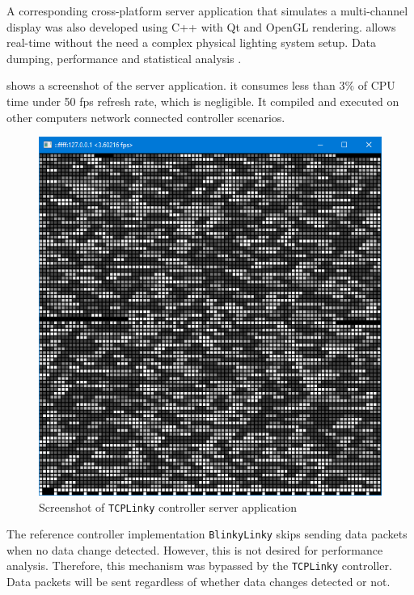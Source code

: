A corresponding cross-platform server application that simulates a multi-channel display was also developed using C++ with Qt \cite{qt} and OpenGL \cite{shreiner2009opengl} rendering.  allows real-time  without the need  a complex physical lighting system setup. Data dumping, performance and statistical analysis .

 shows a screenshot of the server application.  it consumes less than $3 \%$ of CPU time under 50 fps refresh rate, which is negligible. It  compiled and executed on other computers  network connected controller scenarios. 

\begin{figure}[t]
  \centering
  \includegraphics[width=0.6\columnwidth]{Figs/tcplinky_server.png}
  \caption{\footnotesize Screenshot of \texttt{TCPLinky} controller server application}
  \label{fig:tcplinky_server}
\end{figure}

The reference controller implementation \texttt{BlinkyLinky} skips sending data packets when no data change  detected. However, this is not desired for performance analysis. Therefore, this mechanism was bypassed by the \texttt{TCPLinky} controller. Data packets will be sent regardless of whether data changes  detected or not.

